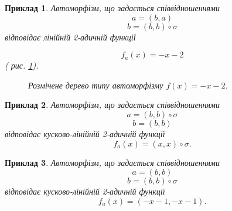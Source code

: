 \documentclass[a4paper,12pt]{article} \usepackage{a4wide}
\numberwithin{equation}{subsection}
\newtheorem{example}{Приклад}[subsection]
\begin{document}
\begin{example}
Автоморфізм, що задається співвідношеннями
$$a = (b,a)$$
$$b = (b,b)\circ \sigma$$
відповідає лінійній 2-адичній функції

$$f_a(x) = -x-2 $$
( рис. \ref{marked_type_tree_mxm2}).
\begin{figure}[h!]
\caption{Розмічене дерево типу автоморфізму $f(x)=-x-2$.}
\label{marked_type_tree_mxm2}
\end{figure}


\end{example}

\begin{example}
Автоморфізм, що задається співвідношеннями
$$a = (b,b)\circ \sigma$$
$$b = (b,b)$$
відповідає кусково-лінійній 2-адичній функції
$$f_a(x) = (x,x)\circ \sigma .$$
\end{example}

\begin{example}
Автоморфізм, що задається співвідношеннями
$$a = (b,b)$$
$$b = (b,b)\circ \sigma$$
відповідає  кусково-лінійній 2-адичній функції
$$f_a(x) = (-x-1,-x-1).$$

\end{example}
\end{document}
